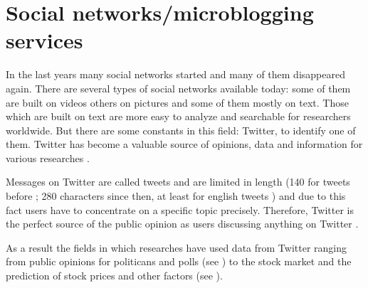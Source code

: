 \section{Social networks/microblogging services}
\label{s:background-socialnetworks}

In the last years many social networks started and many of them disappeared again.
There are several types of social networks available today: some of them are built on videos others on pictures and some of them mostly on text.
Those which are built on text are more easy to analyze and searchable for researchers worldwide.
But there are some constants in this field: Twitter, to identify one of them.
Twitter has become a valuable source of opinions, data and information for various researches \cite{Barbosa2010}.

Messages on Twitter are called tweets and are limited in length (140 for tweets before ; 280 characters since then, at least for english tweets \cite{Rosen2017}) and due to this fact users have to concentrate on a specific topic precisely.
Therefore, Twitter is the perfect source of the public opinion as users discussing anything on Twitter \cite{Pagolu2016a}.

As a result the fields in which researches have used data from Twitter ranging from public opinions for politicans and polls (see \cite{Oconnor2010a,Patodkar2016a}) to the stock market and the prediction of stock prices and other factors (see \cite{Bollen2011a,Mittal2012a,Nguyen2015a,Pagolu2016a,Zhang2011a}).

